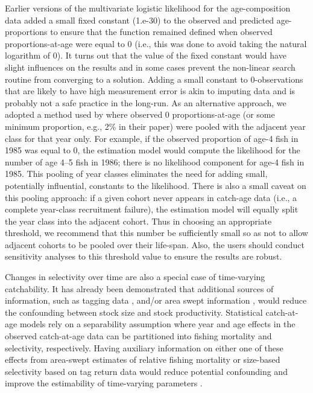 \documentclass[review,letterpaper,10pt,authoryear]{elsarticle}
\begin{document}
Earlier versions of the multivariate logistic likelihood for the age-composition data added a small fixed constant (1.e-30) to the observed and predicted age-proportions to ensure that the function remained defined when observed proportions-at-age were equal to 0 (i.e., this was done to avoid taking the natural logarithm of 0).  It turns out that the value of the fixed constant would have slight influences on the results and in some cases prevent the non-linear search routine from converging to a solution.  Adding a small constant to 0-observations that are likely to have high measurement error is akin to imputing data and is probably not a safe practice in the long-run.  As an alternative approach, we adopted a method used by \cite{richards1997visualizing} where observed 0 proportions-at-age (or some minimum proportion, e.g., 2\% in their paper) were pooled with the adjacent year class for that year only.  For example, if the observed proportion of age-4 fish in 1985 was equal to 0, the estimation model would compute the likelihood for the number of age 4--5 fish in 1986;  there is no likelihood component for age-4 fish in 1985.  This pooling of year classes eliminates the need for adding small, potentially influential, constants to the likelihood. There is also a small caveat on this pooling approach: if a given cohort never appears in catch-age data (i.e., a complete year-class recruitment failure), the estimation model will equally split the year class into the adjacent cohort.  Thus in choosing an appropriate threshold, we recommend that this number be sufficiently small so as not to allow adjacent cohorts to be pooled over their life-span.  Also, the users should conduct sensitivity analyses to this threshold value to ensure the results are robust.

Changes in selectivity over time are also a special case of time-varying catchability.  It has already been demonstrated that additional sources of information, such as tagging data \citep{martell2002implementing}, and/or area swept information \citep{winters1985interaction}, would reduce the confounding between stock size and stock productivity.  Statistical catch-at-age models rely on a separability assumption where year and age effects in the observed catch-at-age data can be partitioned into fishing mortality and selectivity, respectively.  Having auxiliary information on either one of these effects from area-swept estimates of relative fishing mortality or size-based selectivity based on tag return data would reduce potential confounding and improve the estimability of time-varying parameters \citep[e.g.,][]{sinclair2002disentangling}.
\end{document}
